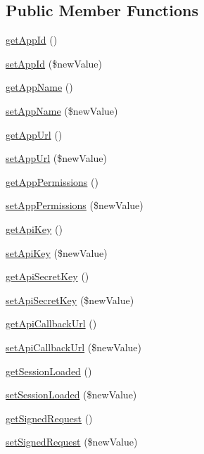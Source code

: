 \subsection*{Public Member Functions}
\begin{DoxyCompactItemize}
\item 
\hyperlink{classCPSFacebook_a3686abfe34c828287edc1d6a8f77367d}{getAppId} ()
\item 
\hyperlink{classCPSFacebook_a5d184a71ba30a0fedb1006f15df66177}{setAppId} (\$newValue)
\item 
\hyperlink{classCPSFacebook_a36da26e368f80dfa10ab2fcedde8b12b}{getAppName} ()
\item 
\hyperlink{classCPSFacebook_ad9727261836418005a302bf42802a84f}{setAppName} (\$newValue)
\item 
\hyperlink{classCPSFacebook_aec474172017ccece67a1c46e1a5a3460}{getAppUrl} ()
\item 
\hyperlink{classCPSFacebook_ab759f3978697fbd0d6de43c959c69664}{setAppUrl} (\$newValue)
\item 
\hyperlink{classCPSFacebook_a9784c3b68605f689b41f10aa28fffcca}{getAppPermissions} ()
\item 
\hyperlink{classCPSFacebook_a466f4d1985a506c8e3be3d9929e4111e}{setAppPermissions} (\$newValue)
\item 
\hyperlink{classCPSFacebook_afdd5b6b54737f556694975ca3d93d773}{getApiKey} ()
\item 
\hyperlink{classCPSFacebook_a5459ba27b6f139cf3f10bab4aec9b6e4}{setApiKey} (\$newValue)
\item 
\hyperlink{classCPSFacebook_ac01814ac1bd26175f55f538e3a4752cc}{getApiSecretKey} ()
\item 
\hyperlink{classCPSFacebook_a8b556659e1d182ba42b528f47f1f217c}{setApiSecretKey} (\$newValue)
\item 
\hyperlink{classCPSFacebook_aca0af56a33a1d36ef2c9c3283d842d9c}{getApiCallbackUrl} ()
\item 
\hyperlink{classCPSFacebook_aecbe7fa989ff4870e8284982d2b4908b}{setApiCallbackUrl} (\$newValue)
\item 
\hyperlink{classCPSFacebook_abd67157f9e772183733ad7a9112c822b}{getSessionLoaded} ()
\item 
\hyperlink{classCPSFacebook_ad4202dd31fb79a9d1e1f4031fffd8623}{setSessionLoaded} (\$newValue)
\item 
\hyperlink{classCPSFacebook_aa89cc38937ab8f8f132f3712c49c6e37}{getSignedRequest} ()
\item 
\hyperlink{classCPSFacebook_a0d55959bc29df7526c0dfcd1c87e750d}{setSignedRequest} (\$newValue)

\end{DoxyCompactItemize}
